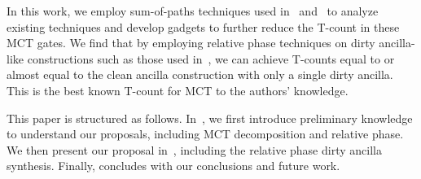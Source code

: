 In this work, we employ sum-of-paths techniques used in~\cite{bib-amy-phase-state} and~\cite{bib-amy-cnot}
to analyze existing techniques and develop gadgets to further reduce the T-count in these MCT
gates. We find that by employing relative phase techniques on dirty ancilla-like constructions such
as those used in~\cite{bib-zindorf-mct}, we can achieve T-counts equal to or almost equal to the
clean ancilla construction with only a single dirty ancilla. This is the best known T-count for MCT
to the authors' knowledge.

This paper is structured as follows. In~, we first introduce preliminary
knowledge to understand our proposals, including MCT decomposition and
relative phase. We then present our proposal in~, including the relative
phase dirty ancilla synthesis. Finally,  concludes with our conclusions and future work.
